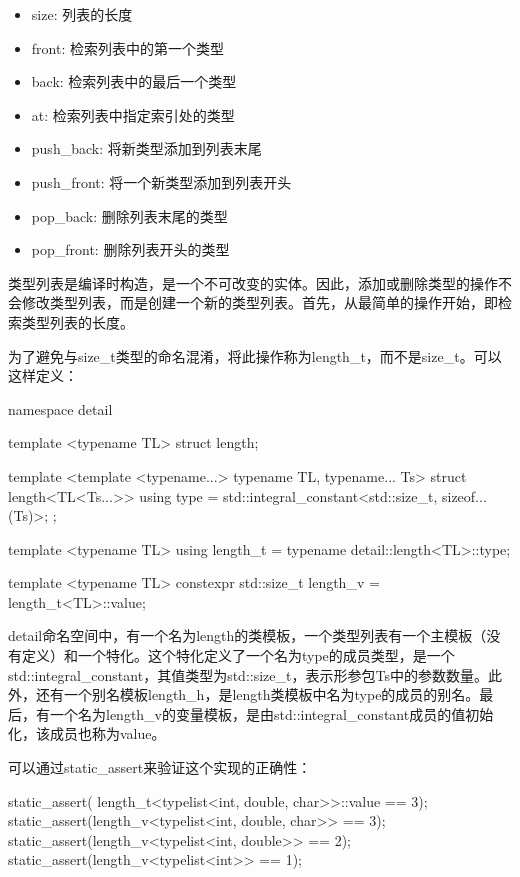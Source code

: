 \begin{itemize}
\item
size: 列表的长度

\item
front: 检索列表中的第一个类型

\item
back: 检索列表中的最后一个类型

\item
at: 检索列表中指定索引处的类型

\item
push\_back: 将新类型添加到列表末尾

\item
push\_front: 将一个新类型添加到列表开头

\item
pop\_back: 删除列表末尾的类型

\item
pop\_front: 删除列表开头的类型
\end{itemize}

类型列表是编译时构造，是一个不可改变的实体。因此，添加或删除类型的操作不会修改类型列表，而是创建一个新的类型列表。首先，从最简单的操作开始，即检索类型列表的长度。

为了避免与size\_t类型的命名混淆，将此操作称为length\_t，而不是size\_t。可以这样定义：

\begin{cpp}
namespace detail
{
	template <typename TL>
	struct length;
	
	template <template <typename...> typename TL,
			  typename... Ts>
	struct length<TL<Ts...>>
	{
		using type =
		std::integral_constant<std::size_t, sizeof...(Ts)>;
	};
}

template <typename TL>
using length_t = typename detail::length<TL>::type;

template <typename TL>
constexpr std::size_t length_v = length_t<TL>::value;
\end{cpp}

detail命名空间中，有一个名为length的类模板，一个类型列表有一个主模板（没有定义）和一个特化。这个特化定义了一个名为type的成员类型，是一个std::integral\_constant，其值类型为std::size\_t，表示形参包Ts中的参数数量。此外，还有一个别名模板length\_h，是length类模板中名为type的成员的别名。最后，有一个名为length\_v的变量模板，是由std::integral\_constant成员的值初始化，该成员也称为value。

可以通过static\_assert来验证这个实现的正确性：

\begin{cpp}
static_assert(
	length_t<typelist<int, double, char>>::value == 3);
static_assert(length_v<typelist<int, double, char>> == 3);
static_assert(length_v<typelist<int, double>> == 2);
static_assert(length_v<typelist<int>> == 1);
\end{cpp}

